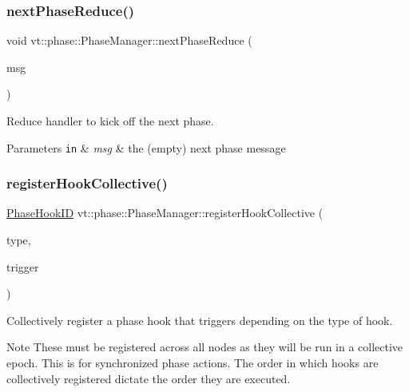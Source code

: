 \subsubsection{\texorpdfstring{next\+Phase\+Reduce()}{nextPhaseReduce()}}
{\footnotesize\ttfamily void vt\+::phase\+::\+Phase\+Manager\+::next\+Phase\+Reduce (\begin{DoxyParamCaption}\item[{\hyperlink{structvt_1_1phase_1_1_next_msg}{Next\+Msg} $\ast$}]{msg }\end{DoxyParamCaption})\hspace{0.3cm}{\ttfamily [private]}}



Reduce handler to kick off the next phase. 


\begin{DoxyParams}[1]{Parameters}
\mbox{\tt in}  & {\em msg} & the (empty) next phase message \\
\hline
\end{DoxyParams}
\mbox{\label{structvt_1_1phase_1_1_phase_manager_a31f6a6f91315fb68826ee073a7cb0a14}} 
\subsubsection{\texorpdfstring{register\+Hook\+Collective()}{registerHookCollective()}}
{\footnotesize\ttfamily \hyperlink{structvt_1_1phase_1_1_phase_hook_i_d}{Phase\+Hook\+ID} vt\+::phase\+::\+Phase\+Manager\+::register\+Hook\+Collective (\begin{DoxyParamCaption}\item[{\hyperlink{namespacevt_1_1phase_aec9a63fdd99680d7a7fe99d321193811}{Phase\+Hook}}]{type,  }\item[{\hyperlink{namespacevt_ae0a5a7b18cc99d7b732cb4d44f46b0f3}{Action\+Type}}]{trigger }\end{DoxyParamCaption})}



Collectively register a phase hook that triggers depending on the type of hook. 

\begin{DoxyNote}{Note}
These must be registered across all nodes as they will be run in a collective epoch. This is for synchronized phase actions. The order in which hooks are collectively registered dictate the order they are executed.
\end{DoxyNote}

